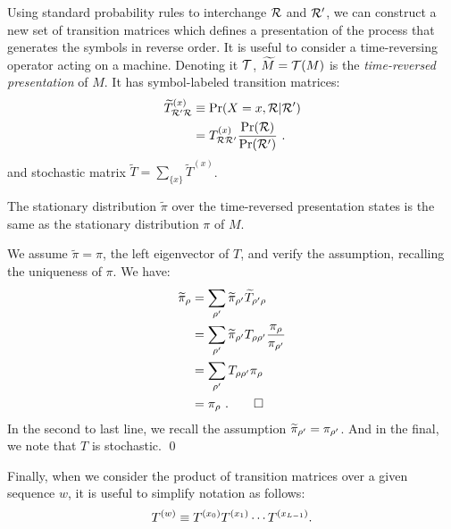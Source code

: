 Using standard probability rules to interchange $\mathcal{R}$ and 
${\cal R}^{\prime}$, we can construct a new set of transition matrices
which defines a presentation of the process that generates the symbols in 
reverse order. It is useful to consider a time-reversing operator acting on a
machine. Denoting it $\mathcal{T}$, $\widetilde{M} = \mathcal{T}(M)$ is the
\emph{time-reversed presentation} of $M$. It has symbol-labeled
transition matrices:
\begin{align}
\widetilde{T}^{(x)}_{{\cal R}^{\prime}\mathcal{R}}
  & \equiv
\Pr({X}={x}, \mathcal{R} | {\cal R}^{\prime})
\nonumber \\
  & = 
T^{(x)}_{\mathcal{R}{\cal R}^{\prime}} 
    \frac{ \Pr(\mathcal{R}) }{ \Pr({\cal R}^{\prime}) } ~.
\end{align}
and stochastic matrix $\widetilde{T} = \sum_{\{x\}} \widetilde{T}^{(x)}$.

\begin{Prop}
\label{eqpi}
The stationary distribution $\widetilde{\pi}$ over the time-reversed
presentation states is the same as the stationary distribution $\pi$ of $M$.
\end{Prop}

\begin{ProProp}
We assume $\widetilde{\pi} = \pi$, the left eigenvector of $T$, and verify the
assumption, recalling the uniqueness of $\pi$. We have:
\begin{align*}
\widetilde{\pi}_\rho 
  &= 
\sum_{{\rho^{\prime}}} \widetilde{\pi}_{\rho^{\prime}} 
                            \widetilde{T}_{\rho^{\prime}\rho} \\
  &=
\sum_{{\rho^{\prime}}} \widetilde{\pi}_{\rho^{\prime}} 
                            T_{\rho\rho^{\prime}} 
                            \frac{\pi_\rho}{\pi_{{\rho^{\prime}}}} \\
 &= 
\sum_{{\rho^{\prime}}} T_{\rho\rho^{\prime}} 
                            \pi_\rho \\
 &= \pi_\rho ~.
\qed
\end{align*}
In the second to last line, we recall the assumption
$\widetilde{\pi}_{\rho^{\prime}} = \pi_{\rho^{\prime}}$.
And in the final, we note that $T$ is stochastic.
\qed
\end{ProProp}

Finally, when we consider the product
of transition matrices over a given sequence $w$, it is useful to simplify
notation as follows:
\begin{align*}
T^{(w)} \equiv T^{({x}_0)} T^{({x}_1)} \cdots 
               T^{({x}_{L-1})}.
\end{align*}


